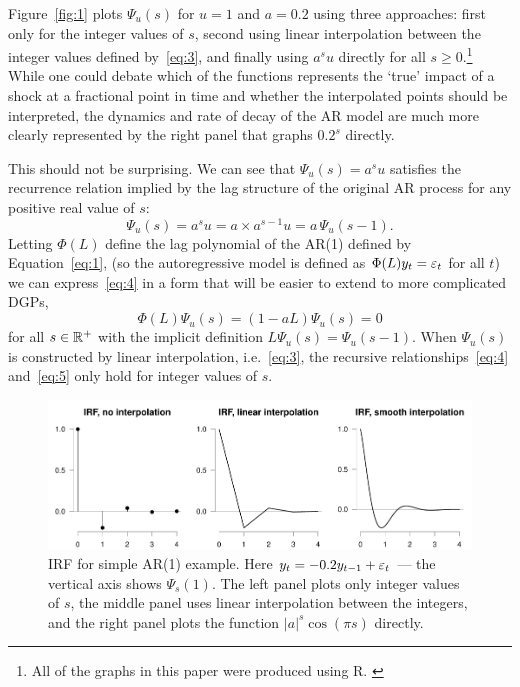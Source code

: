\documentclass[12pt,fleqn]{article}
\begin{document}
Figure~\ref{fig:1} plots $\Psi_u(s)$ for $u = 1$ and $a = 0.2$ using
three approaches: first only for the integer values of $s$, second
using linear interpolation between the integer values defined
by~\eqref{eq:3}, and finally using $a^s u$ directly for all
$s \geq 0$.\footnote{%
  All of the graphs in this paper were produced using R. \citep{R}} %
While one could debate which of the functions represents the `true'
impact of a shock at a fractional point in time and whether the
interpolated points should be interpreted, the dynamics and rate of
decay of the AR model are much more clearly represented by the right
panel that graphs $0.2^s$ directly.

This should not be surprising. We can see that $\Psi_u(s) = a^s u$
satisfies the recurrence relation implied by the lag structure of the
original AR process for any positive real value of $s$:
\begin{equation}
  \label{eq:4}
  \Psi_u(s) = a^s u = a \times a^{s-1} u = a \, \Psi_u(s-1).
\end{equation}
Letting $\Phi(L)$ define the lag polynomial of the AR(1) defined by
Equation~\eqref{eq:1}, (so the autoregressive model is defined as
$\Phi(L)y_t = \varepsilon_t$ for all $t$) we can express~\eqref{eq:4} in a
form that will be easier to extend to more complicated DGPs,
\begin{equation}
  \label{eq:5}
  \Phi(L) \Psi_u(s) = (1 - a L) \Psi_{u}(s) = 0
\end{equation}
for all $s \in \mathbb{R}^+$ with the implicit definition
$L \Psi_u(s) = \Psi_u(s-1)$. When $\Psi_u(s)$ is constructed by linear
interpolation, i.e.~\eqref{eq:3}, the recursive
relationships~\eqref{eq:4} and~\eqref{eq:5} only hold for integer
values of $s$.

\begin{figure}[t]
  \centering
  \includegraphics{graphs/motivation2.pdf}
  \caption{IRF for simple AR(1) example. Here $y_t = -0.2 y_{t-1} +
    \varepsilon_t$ --- the vertical axis shows $\Psi_s(1)$. The left panel
    plots only integer values of $s$, the middle panel uses linear
    interpolation between the integers, and the right panel plots the
    function $|a|^s \cos(\pi s)$ directly.}
  \label{fig:2}
\end{figure}
\end{document}

